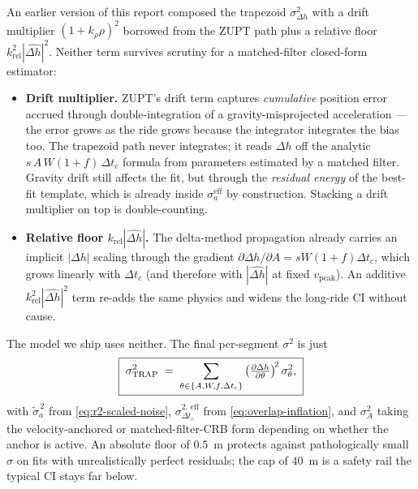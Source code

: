 An earlier version of this report composed the trapezoid
$\sigma_{\Delta h}^{2}$ with a drift multiplier $(1+k_\rho\rho)^2$
borrowed from the ZUPT path plus a relative floor
$k_\mathrm{rel}^2|\hat{\Delta h}|^2$. Neither term survives scrutiny
for a matched-filter closed-form estimator:

\begin{itemize}
  \item \textbf{Drift multiplier.} ZUPT's drift term captures
        \emph{cumulative} position error accrued through
        double-integration of a gravity-misprojected acceleration —
        the error grows as the ride grows because the integrator
        integrates the bias too. The trapezoid path never integrates;
        it reads $\Delta h$ off the analytic
        $s\,A\,W(1+f)\,\Delta t_c$ formula from parameters estimated
        by a matched filter. Gravity drift still affects the fit, but
        through the \emph{residual energy} of the best-fit template,
        which is already inside $\sigma_a^\mathrm{eff}$ by
        construction. Stacking a drift multiplier on top is
        double-counting.
  \item \textbf{Relative floor $k_\mathrm{rel}|\hat{\Delta h}|$.}
        The delta-method propagation already carries an implicit
        $|\Delta h|$ scaling through the gradient
        $\partial\Delta h/\partial A = sW(1+f)\Delta t_c$, which
        grows linearly with $\Delta t_c$ (and therefore with
        $|\hat{\Delta h}|$ at fixed $v_\mathrm{peak}$). An additive
        $k_\mathrm{rel}^2|\hat{\Delta h}|^2$ term re-adds the same
        physics and widens the long-ride CI without cause.
\end{itemize}

The model we ship uses neither. The final per-segment $\sigma^2$ is
just
\begin{equation}
  \boxed{\;
  \sigma^2_{\rm TRAP} \;=\;
  \sum_{\theta\in\{A,W,f,\Delta t_c\}}
  \left(\tfrac{\partial\Delta h}{\partial\theta}\right)^{\!2}\sigma_\theta^2,
  \;}
  \label{eq:trap-sigma-total}
\end{equation}
with $\tilde{\sigma}_a^{\,2}$ from \eqref{eq:r2-scaled-noise},
$\sigma_{\Delta t_c}^{2,\,\mathrm{eff}}$ from
\eqref{eq:overlap-inflation}, and $\sigma_A^2$ taking the
velocity-anchored or matched-filter-CRB form depending on whether the
anchor is active. An absolute floor of $0.5$~m protects against
pathologically small $\sigma$ on fits with unrealistically perfect
residuals; the cap of $40$~m is a safety rail the typical CI stays
far below.

